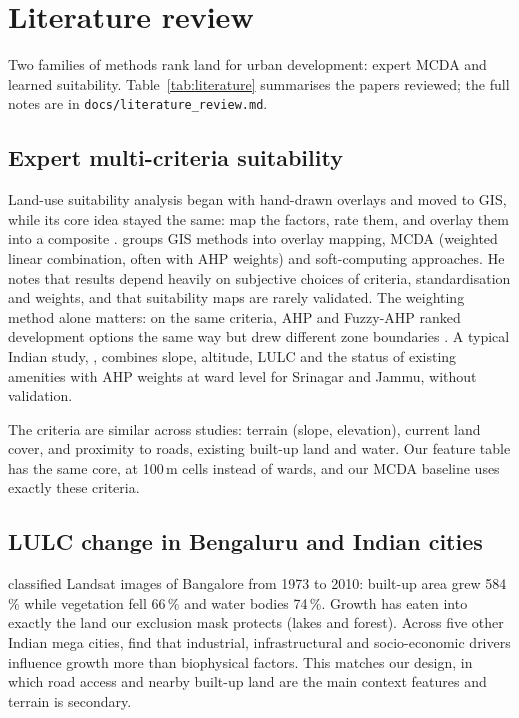 \section{Literature review}\label{sec:literature}

Two families of methods rank land for urban development: expert MCDA and learned suitability.
Table~\ref{tab:literature} summarises the papers reviewed; the full notes are in
\texttt{docs/literature\_review.md}.

\subsection{Expert multi-criteria suitability}

Land-use suitability analysis began with hand-drawn overlays and moved to GIS, while its core
idea stayed the same: map the factors, rate them, and overlay them into a composite
\citep{collins2001}. \citet{malczewski2004} groups GIS methods into overlay mapping, MCDA
(weighted linear combination, often with AHP weights) and soft-computing approaches. He notes
that results depend heavily on subjective choices of criteria, standardisation and weights, and
that suitability maps are rarely validated. The weighting method alone matters: on the same
criteria, AHP and Fuzzy-AHP ranked development options the same way but drew different zone
boundaries \citep{mosadeghi2015}. A typical Indian study, \citet{parry2018}, combines slope,
altitude, LULC and the status of existing amenities with AHP weights at ward level for Srinagar
and Jammu, without validation.

The criteria are similar across studies: terrain (slope, elevation), current land cover, and
proximity to roads, existing built-up land and water. Our feature table has the same core, at
100\,m cells instead of wards, and our MCDA baseline uses exactly these criteria.

\subsection{LULC change in Bengaluru and Indian cities}

\citet{ramachandra2012} classified Landsat images of Bangalore from 1973 to 2010: built-up area
grew 584\,\% while vegetation fell 66\,\% and water bodies 74\,\%. Growth has eaten into exactly
the land our exclusion mask protects (lakes and forest). Across five other Indian mega cities,
\citet{bharath2018} find that industrial, infrastructural and socio-economic drivers influence
growth more than biophysical factors. This matches our design, in which road access and nearby
built-up land are the main context features and terrain is secondary.

